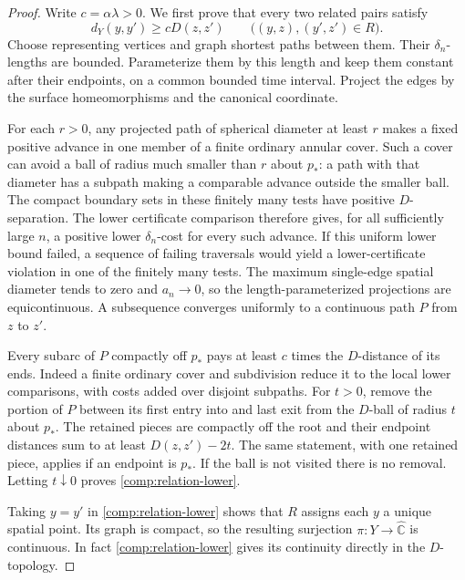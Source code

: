 \documentclass[11pt]{article}
\numberwithin{equation}{section}
\theoremstyle{definition}
\theoremstyle{remark}
\newcommand{\Chat}{\widehat{\mathbb C}}
\newcommand{\1}{\mathbf 1}
\begin{document}
\begin{proof}
Write $c=\alpha\lambda>0$.  We first prove that every two related
pairs satisfy
\begin{equation}
 \label{comp:relation-lower}
 d_Y(y,y')\ge cD(z,z')
 \qquad\bigl((y,z),(y',z')\in R\bigr).
\end{equation}
Choose representing vertices and graph shortest paths between them.
Their $\delta_n$-lengths are bounded.  Parameterize them by this
length and keep them constant after their endpoints, on a common
bounded time interval.  Project the edges by the surface
homeomorphisms and the canonical coordinate.

For each $r>0$, any projected path of spherical diameter at least
$r$ makes a fixed positive advance in one member of a finite
ordinary annular cover.  Such a cover can avoid a ball of radius
much smaller than $r$ about $p_*$: a path with that diameter has a
subpath making a comparable advance outside the smaller ball.
The compact boundary sets in these finitely many tests have
positive $D$-separation.  The lower certificate comparison therefore
gives, for all sufficiently large $n$, a positive lower
$\delta_n$-cost for every such advance.  If this uniform lower
bound failed, a sequence of failing traversals would yield a
lower-certificate violation in one of the finitely many tests.
The maximum single-edge spatial diameter tends to zero and
$a_n\to0$, so the length-parameterized projections are
equicontinuous.  A subsequence converges uniformly to a continuous
path $P$ from $z$ to $z'$.

Every subarc of $P$ compactly off $p_*$ pays at least $c$ times the
$D$-distance of its ends.  Indeed a finite ordinary cover and
subdivision reduce it to the local lower comparisons, with costs
added over disjoint subpaths.  For $t>0$, remove the portion of $P$
between its first entry into and last exit from the $D$-ball of
radius $t$ about $p_*$.  The retained pieces are compactly off the
root and their endpoint distances sum to at least
$D(z,z')-2t$.  The same statement, with one retained piece, applies
if an endpoint is $p_*$.  If the ball is not visited there is no
removal.  Letting $t\downarrow0$ proves
\eqref{comp:relation-lower}.

Taking $y=y'$ in \eqref{comp:relation-lower} shows that $R$ assigns
each $y$ a unique spatial point.  Its graph is compact, so the
resulting surjection $\pi:Y\to\Chat$ is continuous.  In fact
\eqref{comp:relation-lower} gives its continuity directly in the
$D$-topology.


\end{proof}
\end{document}

